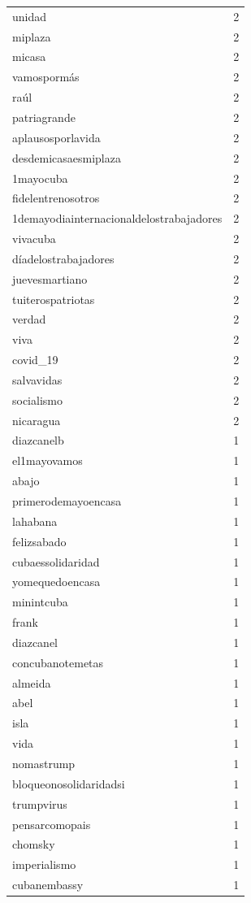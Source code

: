 \begin{tabular}{lr}
unidad & 2 \\
miplaza & 2 \\
micasa & 2 \\
vamospormás & 2 \\
raúl & 2 \\
patriagrande & 2 \\
aplausosporlavida & 2 \\
desdemicasaesmiplaza & 2 \\
1mayocuba & 2 \\
fidelentrenosotros & 2 \\
1demayodiainternacionaldelostrabajadores & 2 \\
vivacuba & 2 \\
díadelostrabajadores & 2 \\
juevesmartiano & 2 \\
tuiterospatriotas & 2 \\
verdad & 2 \\
viva & 2 \\
covid\_19 & 2 \\
salvavidas & 2 \\
socialismo & 2 \\
nicaragua & 2 \\
diazcanelb & 1 \\
el1mayovamos & 1 \\
abajo & 1 \\
primerodemayoencasa & 1 \\
lahabana & 1 \\
felizsabado & 1 \\
cubaessolidaridad & 1 \\
yomequedoencasa & 1 \\
minintcuba & 1 \\
frank & 1 \\
diazcanel & 1 \\
concubanotemetas & 1 \\
almeida & 1 \\
abel & 1 \\
isla & 1 \\
vida & 1 \\
nomastrump & 1 \\
bloqueonosolidaridadsi & 1 \\
trumpvirus & 1 \\
pensarcomopais & 1 \\
chomsky & 1 \\
imperialismo & 1 \\
cubanembassy & 1 \\

\end{tabular}
